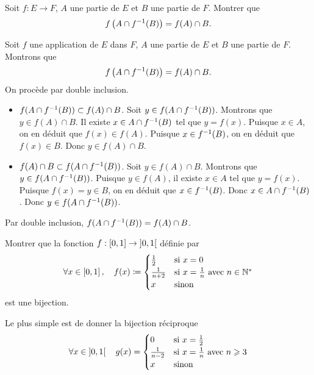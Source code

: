 \documentclass{magnolia}
\begin{document}
Soit $f:E\to F$, $A$ une partie de $E$ et $B$ une partie de $F$. Montrer que
\[f\left(A\cap f^{-1} (B)\right)=f(A)\cap B.\]
\begin{sol}
Soit $f$ une application de $E$ dans $F$, $A$ une partie de $E$ et $B$ une partie de $F$. Montrons que 
\[f\left(A\cap f^{-1} (B)\right)=f(A)\cap B.\]
On procède par double inclusion.
\begin{itemize}
\item $f(A\cap f^{-1} (B))\subset f(A)\cap B$. Soit $y\in f(A\cap f^{-1} (B))$. Montrons que $y\in f(A)\cap B$. Il existe $x\in A\cap f^{-1} (B)$ tel que $y=f(x)$. Puisque $x\in A$, on en déduit que $f(x)\in f(A)$. Puisque $x\in f^{-1} (B)$, on en déduit que $f(x)\in B$. Donc $y\in f(A)\cap B$.
\item $f(A)\cap B\subset f(A\cap f^{-1} (B))$. Soit $y\in f(A)\cap B$. Montrons que $y\in f(A\cap f^{-1} (B))$. Puisque $y\in f(A)$, il existe $x\in A$ tel que $y=f(x)$. Puisque $f(x)=y\in B$, on en déduit que $x\in f^{-1}(B)$. Donc $x\in A\cap f^{-1}(B)$. Donc $y\in f(A\cap f^{-1}(B))$.
\end{itemize}
Par double inclusion, $f(A\cap f^{-1} (B))= f(A)\cap B$.
\end{sol}


Montrer que la fonction $f:\left[0,1\right] \rightarrow \left]0,1\right[$ définie
par
\[\forall x\in\left[0,1\right] ,\quad f(x)\coloneqq
  \begin{cases}
  \frac{1}{2} & \text{si $x=0$}\\
  \frac{1}{n+2} & \text{si $x=\frac{1}{n}$ avec $n\in{\mathbb{N}^*}$}\\
  x  &\text{sinon}
  \end{cases}\]
est une bijection.
\begin{sol}
Le plus simple est de donner la bijection réciproque
\[\forall x\in\left]0,1\right[ \quad g(x)=
  \begin{cases}
  0 & \text{si $x=\frac{1}{2}$}\\
  \frac{1}{n-2} & \text{si $x=\frac{1}{n}$ avec $n\geqslant 3$}\\
  x  &\text{sinon}
  \end{cases}\]
\end{sol}
\end{document}
